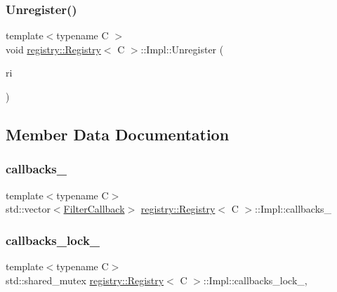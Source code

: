 \subsubsection{\texorpdfstring{Unregister()}{Unregister()}}
{\footnotesize\ttfamily template$<$typename C $>$ \\
void \hyperlink{classregistry_1_1Registry}{registry\+::\+Registry}$<$ C $>$\+::Impl\+::\+Unregister (\begin{DoxyParamCaption}\item[{\hyperlink{classregistry_1_1RegItem}{Reg\+Item}}]{ri }\end{DoxyParamCaption})\hspace{0.3cm}{\ttfamily [inline]}}



\subsection{Member Data Documentation}
\mbox{\label{classregistry_1_1Registry_1_1Impl_ad808df523ce751861dbffbfcbe0bec86}} 
\subsubsection{\texorpdfstring{callbacks\+\_\+}{callbacks\_}}
{\footnotesize\ttfamily template$<$typename C$>$ \\
std\+::vector$<$\hyperlink{classregistry_1_1AbstractRegistry_a31f6bef634dcd324efebaf55f99b950f}{Filter\+Callback}$>$ \hyperlink{classregistry_1_1Registry}{registry\+::\+Registry}$<$ C $>$\+::Impl\+::callbacks\+\_\+\hspace{0.3cm}{\ttfamily [private]}}

\mbox{\label{classregistry_1_1Registry_1_1Impl_a50a02d7a61ab99d3dcdb8440db8e9b48}} 
\subsubsection{\texorpdfstring{callbacks\+\_\+lock\+\_\+}{callbacks\_lock\_}}
{\footnotesize\ttfamily template$<$typename C$>$ \\
std\+::shared\+\_\+mutex \hyperlink{classregistry_1_1Registry}{registry\+::\+Registry}$<$ C $>$\+::Impl\+::callbacks\+\_\+lock\+\_\+\hspace{0.3cm}{\ttfamily [mutable]}, {\ttfamily [private]}}

